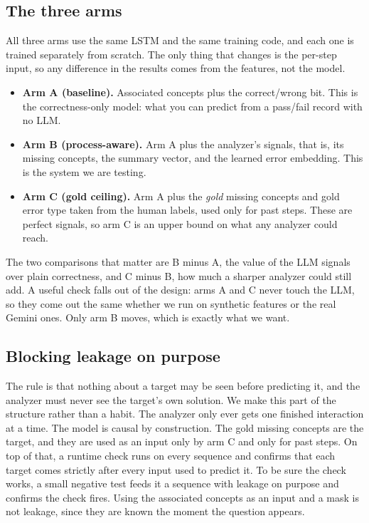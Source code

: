 \documentclass[11pt]{article}
\begin{document}
\subsection{The three arms}
All three arms use the same LSTM and the same training code, and each one is trained
separately from scratch. The only thing that changes is the per-step input, so any
difference in the results comes from the features, not the model.
\begin{itemize}[leftmargin=1.4em,itemsep=2pt,topsep=2pt]
\item \textbf{Arm A (baseline).} Associated concepts plus the correct/wrong bit. This is
the correctness-only model: what you can predict from a pass/fail record with no LLM.
\item \textbf{Arm B (process-aware).} Arm A plus the analyzer's signals, that is, its
missing concepts, the summary vector, and the learned error embedding. This is the
system we are testing.
\item \textbf{Arm C (gold ceiling).} Arm A plus the \emph{gold} missing concepts and
gold error type taken from the human labels, used only for past steps. These are perfect
signals, so arm C is an upper bound on what any analyzer could reach.
\end{itemize}
The two comparisons that matter are B minus A, the value of the LLM signals over plain
correctness, and C minus B, how much a sharper analyzer could still add. A useful check
falls out of the design: arms A and C never touch the LLM, so they come out the same
whether we run on synthetic features or the real Gemini ones. Only arm B moves, which is
exactly what we want.

\subsection{Blocking leakage on purpose}
\label{sec:leakage}
The rule is that nothing about a target may be seen before predicting it, and the
analyzer must never see the target's own solution. We make this part of the structure
rather than a habit. The analyzer only ever gets one finished interaction at a time. The
model is causal by construction. The gold missing concepts are the target, and they
are used as an input only by arm C and only for past steps. On top of that, a runtime
check runs on every sequence and confirms that each target comes strictly after every
input used to predict it. To be sure the check works, a small negative test feeds it a
sequence with leakage on purpose and confirms the check fires. Using the associated
concepts as an input and a mask is not leakage, since they are known the moment the
question appears.
\end{document}
